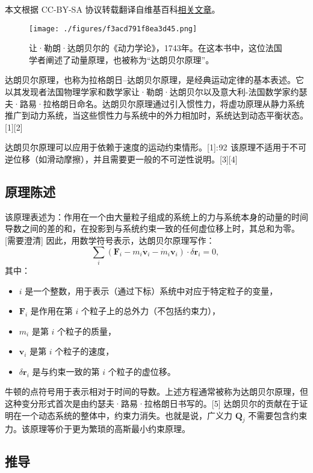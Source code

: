 
本文根据 CC-BY-SA 协议转载翻译自维基百科\href{https://en.wikipedia.org/wiki/D\%27Alembert\%27s_principle}{相关文章}。

\begin{figure}[ht]
\centering
\texttt{[image: ./figures/f3acd791f8ea3d45.png]}
\caption{让·勒朗·达朗贝尔的《动力学论》，1743年。在这本书中，这位法国学者阐述了动量原理，也被称为“达朗贝尔原理”。} \label{fig_DAP_1}
\end{figure}
达朗贝尔原理，也称为拉格朗日–达朗贝尔原理，是经典运动定律的基本表述。它以其发现者法国物理学家和数学家让·勒朗·达朗贝尔以及意大利-法国数学家约瑟夫·路易·拉格朗日命名。达朗贝尔原理通过引入惯性力，将虚功原理从静力系统推广到动力系统，当这些惯性力与系统中的外力相加时，系统达到动态平衡状态。[1][2]

达朗贝尔原理可以应用于依赖于速度的运动约束情形。[1]: 92  该原理不适用于不可逆位移（如滑动摩擦），并且需要更一般的不可逆性说明。[3][4]
\subsection{原理陈述}
该原理表述为：作用在一个由大量粒子组成的系统上的力与系统本身的动量的时间导数之间的差的和，在投影到与系统约束一致的任何虚位移上时，其总和为零。[需要澄清] 因此，用数学符号表示，达朗贝尔原理写作：
\[
\sum_{i} \left( \mathbf{F}_i - m_i \dot{\mathbf{v}}_i - \dot{m}_i \mathbf{v}_i \right) \cdot \delta \mathbf{r}_i = 0,~
\]
其中：
\begin{itemize}
\item \( i \) 是一个整数，用于表示（通过下标）系统中对应于特定粒子的变量，
\item \( \mathbf{F}_i \) 是作用在第 \( i \) 个粒子上的总外力（不包括约束力），
\item \( m_i \) 是第 \( i \) 个粒子的质量，
\item \( \mathbf{v}_i \) 是第 \( i \) 个粒子的速度，
\item \( \delta \mathbf{r}_i \) 是与约束一致的第 \( i \) 个粒子的虚位移。
\end{itemize}
牛顿的点符号用于表示相对于时间的导数。上述方程通常被称为达朗贝尔原理，但这种变分形式首次是由约瑟夫·路易·拉格朗日书写的。[5] 达朗贝尔的贡献在于证明在一个动态系统的整体中，约束力消失。也就是说，广义力 \( \mathbf{Q}_j \) 不需要包含约束力。该原理等价于更为繁琐的高斯最小约束原理。
\subsection{推导}
